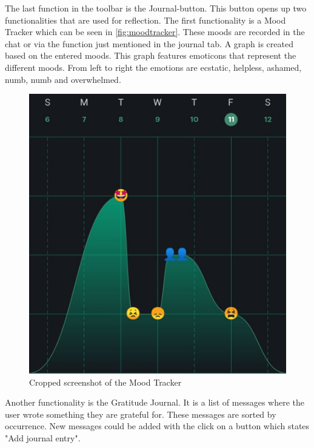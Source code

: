 The last function in the toolbar is the Journal-button.
This button opens up two functionalities that are used for reflection.
The first functionality is a Mood Tracker which can be seen in \autoref{fig:moodtracker}.
These moods are recorded in the chat or via the function just mentioned in the journal tab.
A graph is created based on the entered moods.
This graph features emoticons that represent the different moods.
From left to right the emotions are ecstatic, helpless, ashamed, numb, numb and overwhelmed.\\

\begin{figure}[ht]
  \begin{center}
    \includegraphics[width=1\columnwidth]{files/moodtracker.png}
    \caption{\label{fig:moodtracker} Cropped screenshot of the Mood Tracker}
  \end{center}
\end{figure}

Another functionality is the Gratitude Journal.
It is a list of messages where the user wrote something they are grateful for.
These messages are sorted by occurrence.
New messages could be added with the click on a button which states "Add journal entry".\\

